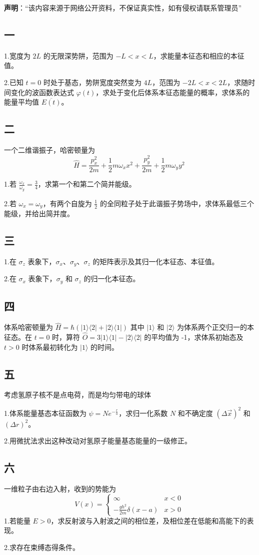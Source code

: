 
\textbf{声明}：“该内容来源于网络公开资料，不保证真实性，如有侵权请联系管理员”

\subsection{一}
1.宽度为 $2L$ 的无限深势阱，范围为 $-L < x < L$，求能量本征态和相应的本征值。

2.已知 $t = 0$ 时处于基态，势阱宽度突然变为 $4L$，范围为 $-2L < x < 2L$，求随时间变化的波函数表达式 $\varphi(t)$，求处于变化后体系本征态能量的概率，求体系的能量平均值 $\overline{E(t)}$。
\subsection{二}
一个二维谐振子，哈密顿量为
$$\hat{H} = \frac{p_x^2}{2m} + \frac{1}{2} m \omega_x x^2 + \frac{p_y^2}{2m} + \frac{1}{2} m \omega_y y^2~$$

1.若 $\frac{\omega_x}{\omega_y} = \frac{3}{4}$，求第一个和第二个简并能级。

2.若 $\omega_x = \omega_y$，有两个自旋为 $\frac{1}{2}$ 的全同粒子处于此谐振子势场中，求体系最低三个能级，并给出简并度。
\subsection{三}
1.在 $\sigma_z$ 表象下，$\sigma_x$、$\sigma_y$、$\sigma_z$ 的矩阵表示及其归一化本征态、本征值。

2.在 $\sigma_x$ 表象下，$\sigma_y$ 和 $\sigma_z$ 的归一化本征态。
\subsection{四}
体系哈密顿量为
$\hat{H} = \hbar( |1\rangle \langle 2| + |2\rangle \langle 1| )$
其中 $|1\rangle$ 和 $|2\rangle$ 为体系两个正交归一的本征态。在 $t=0$ 时，算符
$\hat{O} = 3 |1\rangle \langle 1| - |2\rangle \langle 2|$
的平均值为 -1，求体系初始态及 $t > 0$ 时体系最初转化为 $|1\rangle$ 的时间。
\subsection{五}
考虑氢原子核不是点电荷，而是均匀带电的球体

1.体系能量基态本征函数为 $\psi = N e^{-\frac{r}{a}}$，求归一化系数 $N$ 和不确定度 $(\Delta \vec x)^2$ 和 $(\Delta r)^2$。

2.用微扰法求出这种改动对氢原子能量基态能量的一级修正。
\subsection{六}
一维粒子由右边入射，收到的势能为
$$V(x) = \begin{cases}
\infty & x < 0 \\
-\frac{gh^2}{2m} \delta(x-a) & x > 0
\end{cases}~$$
1.若能量 $E > 0$，求反射波与入射波之间的相位差，及相位差在低能和高能下的表现。

2.求存在束缚态得条件。
